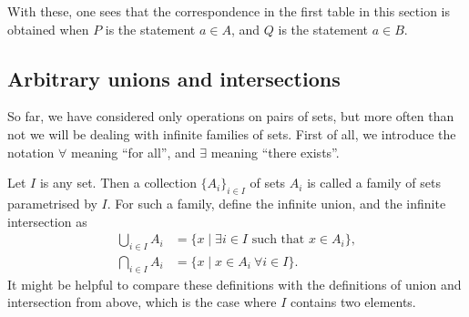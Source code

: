 With these, one sees that the correspondence in the first table in this section is obtained when $P$ is the statement $a \in A$, and $Q$ is the statement $a \in B$.

\subsection{Arbitrary unions and intersections}
So far, we have considered only operations on pairs of sets, but more often than not we will be dealing with infinite families of sets. First of all, we introduce the notation $\forall$ meaning ``for all'', and $\exists$ meaning ``there exists''.

Let $I$ is any set. Then a collection $\{ A_i \}_{i \in I}$ of sets $A_i$ is called a family of sets parametrised by $I$. For such a family, define the infinite union, and the infinite intersection as
\begin{align*}
  \bigcup_{i \in I} A_i &= \{ x \mid \text{$\exists i \in I$ such that $x \in A_i$} \},\\
  \bigcap_{i \in I} A_i &= \{ x \mid \text{$x \in A_i \ \forall i \in I$} \}.
\end{align*}
It might be helpful to compare these definitions with the definitions of union and intersection from above, which is the case where $I$ contains two elements.

